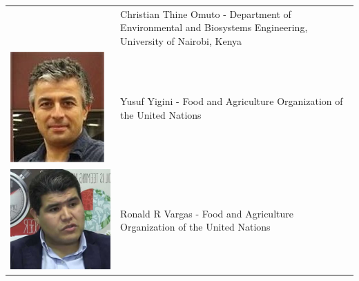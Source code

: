 \documentclass[10pt,b5paper,]{book}
\theoremstyle{definition}
\theoremstyle{definition}
\theoremstyle{definition}
\theoremstyle{remark}
\begin{document}
\begin{longtable}[]{@{}ll@{}}
\begin{minipage}[t]{0.13\columnwidth}
\end{minipage} & \begin{minipage}[t]{0.81\columnwidth}\raggedright
Christian Thine Omuto - Department of Environmental and Biosystems
Engineering, University of Nairobi, Kenya\strut
\end{minipage}\tabularnewline
\begin{minipage}[t]{0.13\columnwidth}\raggedright
\includegraphics{contrAuthors/Yigini.jpg}\strut
\end{minipage} & \begin{minipage}[t]{0.81\columnwidth}\raggedright
Yusuf Yigini - Food and Agriculture Organization of the United
Nations\strut
\end{minipage}\tabularnewline
\begin{minipage}[t]{0.13\columnwidth}\raggedright
\includegraphics{contrAuthors/Vargas.jpg}\strut
\end{minipage} & \begin{minipage}[t]{0.81\columnwidth}\raggedright
Ronald R Vargas - Food and Agriculture Organization of the United
Nations\strut
\end{minipage}\tabularnewline
\bottomrule
\end{longtable}
\end{document}

